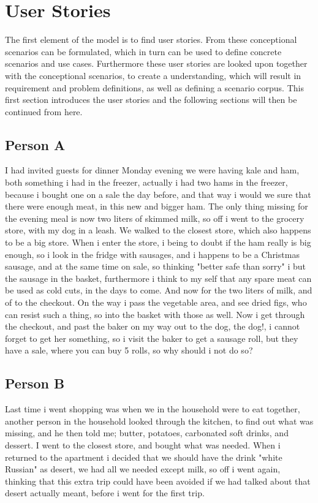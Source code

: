 \section{User Stories} \label{UserStories}
The first element of the model is to find user stories. From these conceptional scenarios can be formulated, which in turn can be used to define concrete scenarios and use cases. Furthermore these user stories are looked upon together with the conceptional scenarios, to create a understanding, which will result in requirement and problem definitions, as well as defining a scenario corpus. This first section introduces the user stories and the following sections will then be continued from here. 

\subsection{Person A}
I had invited guests for dinner Monday evening we were having kale and ham, both something i had in the freezer, actually i had two hams in the freezer, because i bought one on a sale the day before, and that way i would we sure that there were enough meat, in this new and bigger ham. The only thing missing for the evening meal is now two liters of skimmed milk, so off i went to the grocery store, with my dog in a leash. We walked to the closest store, which also happens to be a big store. When i enter the store, i being to doubt if the ham really is big enough, so i look in the fridge with sausages, and i happens to be a Christmas sausage, and at the same time on sale, so thinking "better safe than sorry" i but the sausage in the basket, furthermore i think to my self that any spare meat can be used as cold cuts, in the days to come. And now for the two liters of milk, and of to the checkout. On the way i pass the vegetable area, and see dried figs, who can resist such a thing, so into the basket with those as well. Now i get through the checkout, and past the baker on my way out to the dog, the dog!, i cannot forget to get her something, so i visit the baker to get a sausage roll, but they have a sale, where you can buy 5 rolls, so why should i not do so?

\subsection{Person B}
Last time i went shopping was when we in the household were to eat together, another person in the household looked through the kitchen, to find out what was missing, and he then told me; butter, potatoes, carbonated soft drinks, and dessert. I went to the closest store, and bought what was needed. When i returned to the apartment i decided that we should have the drink "white Russian" as desert, we had all we needed except milk, so off i went again, thinking that this extra trip could have been avoided if we had talked about that desert actually meant, before i went for the first trip.
 
